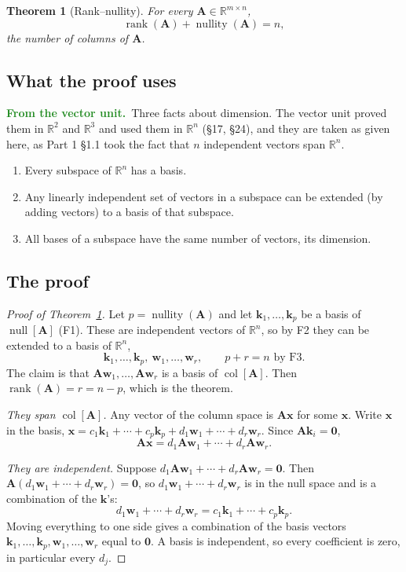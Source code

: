 \documentclass[11pt]{article}
\theoremstyle{plain}
\newtheorem{thm}{Theorem}[section]
\theoremstyle{definition}
\theoremstyle{remark}
\newcommand{\lookback}[1][the vector unit]{\par\smallskip\noindent
  \textbf{\sffamily\textcolor{ForestGreen}{From #1.}}\ \ignorespaces}
\newcommand{\R}{\mathbb{R}}
\newcommand{\vc}[1]{\mathbf{#1}}
\newcommand{\mt}[1]{\mathbf{#1}}
\newcommand{\colsp}[1]{\operatorname{col}[#1]}
\newcommand{\nullsp}[1]{\operatorname{null}[#1]}
\DeclareMathOperator{\rank}{rank}
\DeclareMathOperator{\nullity}{nullity}
\begin{document}
\begin{thm}[Rank--nullity]
\label{thm:ranknullity}
For every $\mt{A}\in\R^{m\times n}$,
\[
  \boxed{\;\rank(\mt{A})+\nullity(\mt{A})=n,\;}
\]
the number of columns of $\mt{A}$.
\end{thm}

\subsection{What the proof uses}
\lookback Three facts about dimension. The vector unit proved them in $\R^{2}$
and $\R^{3}$ and used them in $\R^{n}$ (\S17, \S24), and they are taken as given
here, as Part 1 \S1.1 took the fact that $n$ independent vectors span $\R^{n}$.
\begin{enumerate}[label=\textbf{F\arabic*.},leftmargin=2.6em,itemsep=2pt]
  \item Every subspace of $\R^{n}$ has a basis.
  \item Any linearly independent set of vectors in a subspace can be extended
        (by adding vectors) to a basis of that subspace.
  \item All bases of a subspace have the same number of vectors, its dimension.
\end{enumerate}

\subsection{The proof}
\begin{proof}[Proof of Theorem~\ref{thm:ranknullity}]
Let $p=\nullity(\mt{A})$ and let $\vc{k}_1,\dots,\vc{k}_p$ be a basis of
$\nullsp{\mt{A}}$ (F1). These are independent vectors of $\R^{n}$, so by F2 they
can be extended to a basis of $\R^{n}$,
\[
  \vc{k}_1,\dots,\vc{k}_p,\ \vc{w}_1,\dots,\vc{w}_r,
  \qquad p+r=n \text{ by F3}.
\]
The claim is that $\mt{A}\vc{w}_1,\dots,\mt{A}\vc{w}_r$ is a basis of
$\colsp{\mt{A}}$. Then $\rank(\mt{A})=r=n-p$, which is the theorem.

\emph{They span $\colsp{\mt{A}}$.} Any vector of the column space is
$\mt{A}\vc{x}$ for some $\vc{x}$. Write $\vc{x}$ in the basis,
$\vc{x}=c_1\vc{k}_1+\cdots+c_p\vc{k}_p+d_1\vc{w}_1+\cdots+d_r\vc{w}_r$. Since
$\mt{A}\vc{k}_i=\vc{0}$,
\[
  \mt{A}\vc{x}=d_1\mt{A}\vc{w}_1+\cdots+d_r\mt{A}\vc{w}_r .
\]

\emph{They are independent.} Suppose
$d_1\mt{A}\vc{w}_1+\cdots+d_r\mt{A}\vc{w}_r=\vc{0}$. Then
$\mt{A}(d_1\vc{w}_1+\cdots+d_r\vc{w}_r)=\vc{0}$, so
$d_1\vc{w}_1+\cdots+d_r\vc{w}_r$ is in the null space and is a combination of
the $\vc{k}$'s:
\[
  d_1\vc{w}_1+\cdots+d_r\vc{w}_r=c_1\vc{k}_1+\cdots+c_p\vc{k}_p .
\]
Moving everything to one side gives a combination of the basis vectors
$\vc{k}_1,\dots,\vc{k}_p,\vc{w}_1,\dots,\vc{w}_r$ equal to $\vc{0}$. A basis is
independent, so every coefficient is zero, in particular every $d_j$.
\end{proof}
\end{document}
